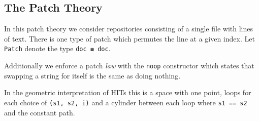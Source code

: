 \subsection{The Patch Theory}

In this patch theory we consider repositories consisting of a single file with lines of text.
There is one type of patch which permutes the line at a given index. Let \texttt{Patch} denote the type
\texttt{doc ≡ doc}.

Additionally we enforce a patch \emph{law} with the \texttt{noop} constructor which states that
swapping a string for itself is the same as doing nothing.

In the geometric interpretation of HITs this is a space with one point, loops for each choice of
\texttt{(s1, s2, i)} and a cylinder between each loop where \texttt{s1 == s2} and the constant path.

